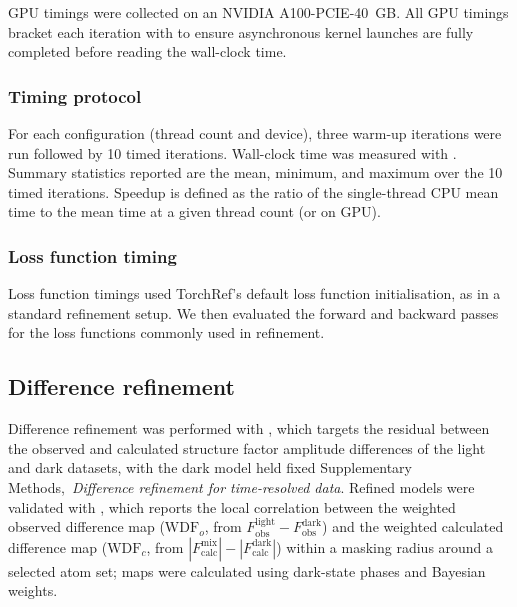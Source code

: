 \documentclass{iucrjournals}
\newcommand{\suppref}[1]{Supplementary Methods,~\emph{#1}}
\begin{document}
GPU timings were collected on an NVIDIA A100-PCIE-40~GB.
All GPU timings bracket each iteration with 
to ensure asynchronous kernel launches are fully completed before reading the
wall-clock time.

\subsubsection{Timing protocol}

For each configuration (thread count and device), three warm-up iterations
were run followed by 10 timed iterations.
Wall-clock time was measured with .
Summary statistics reported are the mean, minimum, and maximum over the 10
timed iterations.
Speedup is defined as the ratio of the single-thread CPU mean time to the mean
time at a given thread count (or on GPU).

\subsubsection{Loss function timing}

Loss function timings used TorchRef's default loss function initialisation, as
in a standard refinement setup.
We then evaluated the forward and backward passes for the loss functions commonly used in refinement.

\subsection{Difference refinement}

Difference refinement was performed with ,
which targets the residual between the observed and calculated structure
factor amplitude differences of the light and dark datasets,
with the dark model held fixed \suppref{Difference refinement for time-resolved data}.
Refined models were validated with , which reports
the local correlation between the weighted observed difference map
($\mathrm{WDF}_o$, from $F_\mathrm{obs}^\mathrm{light} - F_\mathrm{obs}^\mathrm{dark}$)
and the weighted calculated difference map
($\mathrm{WDF}_c$, from $|F_\mathrm{calc}^\mathrm{mix}| - |F_\mathrm{calc}^\mathrm{dark}|$)
within a masking radius around a selected atom set; maps were calculated using
dark-state phases and Bayesian weights.
\end{document}
